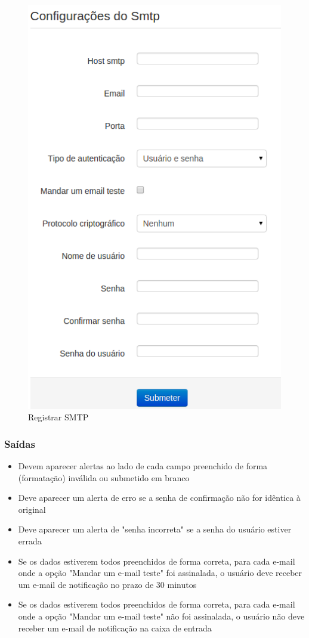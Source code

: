 \begin{figure}[ht]
     \centering
     \includegraphics[scale=0.6]{images/smtp.png}
     \caption{Registrar SMTP}
     \label{fig:smtp}
\end{figure}

\subsubsection{Saídas}

\begin{itemize}
    \item Devem aparecer alertas ao lado de cada campo preenchido de forma (formatação) inválida ou submetido em branco
	\item Deve aparecer um alerta de erro se a senha de confirmação não for idêntica à original
	\item Deve aparecer um alerta de "senha incorreta" se a senha do usuário estiver errada
	\item Se os dados estiverem todos preenchidos de forma correta, para cada e-mail onde a opção "Mandar um e-mail teste" foi assinalada, o usuário deve receber um e-mail de notificação no prazo de 30 minutos
	\item Se os dados estiverem todos preenchidos de forma correta, para cada e-mail onde a opção "Mandar um e-mail teste" não foi assinalada, o usuário não deve receber um e-mail de notificação na caixa de entrada
\end{itemize}

